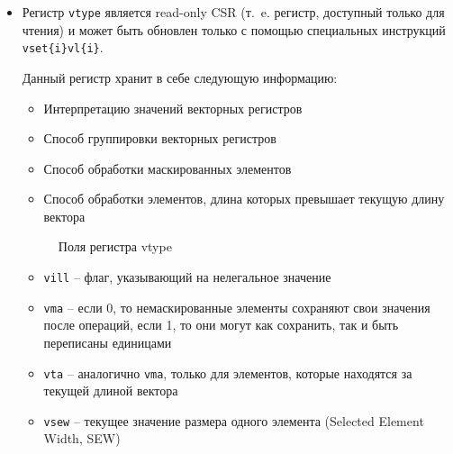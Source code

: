 \begin{itemize}
\item Регистр \texttt{vtype} является read-only CSR (т.~e. регистр, доступный только для
чтения) и может быть обновлен только с помощью специальных инструкций
\texttt{vset\{i\}vl\{i\}}.

Данный регистр хранит в себе следующую информацию:

\begin{itemize}
	\item Интерпретацию значений векторных регистров
	\item Способ группировки векторных регистров
	\item Способ обработки маскированных элементов
	\item Способ обработки элементов, длина которых превышает текущую длину вектора
\end{itemize}

\begin{figure}[H]
\centering
{}
\caption{Поля регистра vtype}
\label{fig:vtype}
\end{figure}

\begin{itemize}
	\item \texttt{vill} -- флаг, указывающий на нелегальное значение
	\item \texttt{vma} -- если 0, то немаскированные элементы сохраняют свои значения
	после операций, если 1, то они могут как сохранить, так и быть переписаны единицами
	\item \texttt{vta} -- аналогично \texttt{vma}, только для элементов, которые
	находятся за текущей длиной вектора
	\item \texttt{vsew} -- текущее значение размера одного элемента (Selected Element
	Width, SEW)


\end{itemize}
\end{itemize}
